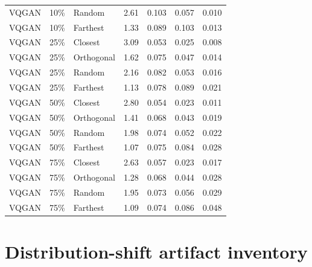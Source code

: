 \begin{longtable}{lllrrrr}
VQGAN & 10\% & Random & 2.61 & 0.103 & 0.057 & 0.010 \\
VQGAN & 10\% & Farthest & 1.33 & 0.089 & 0.103 & 0.013 \\
VQGAN & 25\% & Closest & 3.09 & 0.053 & 0.025 & 0.008 \\
VQGAN & 25\% & Orthogonal & 1.62 & 0.075 & 0.047 & 0.014 \\
VQGAN & 25\% & Random & 2.16 & 0.082 & 0.053 & 0.016 \\
VQGAN & 25\% & Farthest & 1.13 & 0.078 & 0.089 & 0.021 \\
VQGAN & 50\% & Closest & 2.80 & 0.054 & 0.023 & 0.011 \\
VQGAN & 50\% & Orthogonal & 1.41 & 0.068 & 0.043 & 0.019 \\
VQGAN & 50\% & Random & 1.98 & 0.074 & 0.052 & 0.022 \\
VQGAN & 50\% & Farthest & 1.07 & 0.075 & 0.084 & 0.028 \\
VQGAN & 75\% & Closest & 2.63 & 0.057 & 0.023 & 0.017 \\
VQGAN & 75\% & Orthogonal & 1.28 & 0.068 & 0.044 & 0.028 \\
VQGAN & 75\% & Random & 1.95 & 0.073 & 0.056 & 0.029 \\
VQGAN & 75\% & Farthest & 1.09 & 0.074 & 0.086 & 0.048 \\
\end{longtable}
\endgroup

\section{Distribution-shift artifact inventory}

